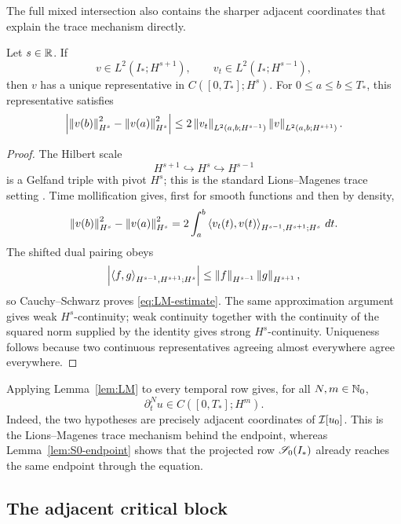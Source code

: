 The full mixed intersection also contains the sharper adjacent coordinates
that explain the trace mechanism directly.

\begin{lemma}
\label{lem:LM}
Let \(s\in\mathbb R\). If
\[
 v\in L^2(I_*;H^{s+1}),
 \qquad v_t\in L^2(I_*;H^{s-1}),
\]
then \(v\) has a unique representative in \(C([0,T_*];H^s)\). For
\(0\leq a\leq b\leq T_*\), this representative satisfies
\begin{equation}
 \left|\left\lVert v(b)\right\rVert_{H^s}^2-\left\lVert v(a)\right\rVert_{H^s}^2\right|
 \leq
 2\left\lVert v_t\right\rVert_{L^2(a,b;H^{s-1})}
  \left\lVert v\right\rVert_{L^2(a,b;H^{s+1})}.
 \label{eq:LM-estimate}
\end{equation}
\end{lemma}

\begin{proof}
The Hilbert scale
\[
 H^{s+1}\hookrightarrow H^s\hookrightarrow H^{s-1}
\]
is a Gelfand triple with pivot \(H^s\); this is the standard
Lions--Magenes trace setting \cite{LM}. Time mollification gives, first for
smooth functions and then by density,
\[
 \left\lVert v(b)\right\rVert_{H^s}^2-\left\lVert v(a)\right\rVert_{H^s}^2
 =2\int_a^b
 \left\langle v_t(t),v(t)\right\rangle_{H^{s-1},H^{s+1};H^s}\,dt.
\]
The shifted dual pairing obeys
\[
 \left|\left\langle f,g\right\rangle_{H^{s-1},H^{s+1};H^s}\right|
 \leq\left\lVert f\right\rVert_{H^{s-1}}\left\lVert g\right\rVert_{H^{s+1}},
\]
so Cauchy--Schwarz proves \eqref{eq:LM-estimate}. The same approximation
argument gives weak \(H^s\)-continuity; weak continuity together with the
continuity of the squared norm supplied by the identity gives strong
\(H^s\)-continuity. Uniqueness follows because two continuous representatives
agreeing almost everywhere agree everywhere.
\end{proof}

Applying Lemma~\ref{lem:LM} to every temporal row gives, for all
\(N,m\in\mathbb N_0\),
\begin{equation}
 \partial_t^N u\in C([0,T_*];H^m).
 \label{eq:all-traces}
\end{equation}
Indeed, the two hypotheses are precisely adjacent coordinates of
\(\mathcal I[u_0]\). This is the Lions--Magenes trace mechanism behind the endpoint,
whereas Lemma~\ref{lem:S0-endpoint} shows that the projected row
\(\mathscr S_0(I_*)\) already reaches the same endpoint through the equation.

\subsection{The adjacent critical block}


